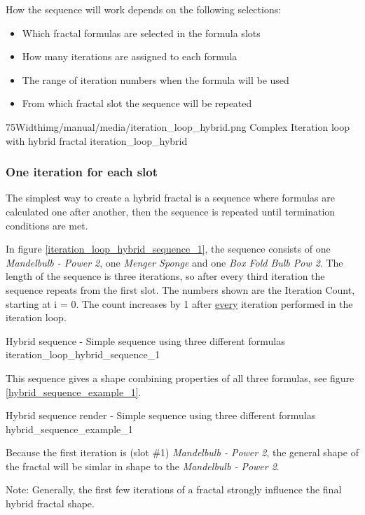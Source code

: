 How the sequence will work depends on the following selections:
\begin{itemize}
	\item Which fractal formulas are selected in the formula slots
	\item How many iterations are assigned to each formula
	\item The range of iteration numbers when the formula will be used
	\item From which fractal slot the sequence will be repeated
\end{itemize}

\simpleImageWithCaption75Width{img/manual/media/iteration_loop_hybrid.png}
{Complex Iteration loop with hybrid fractal}
{iteration_loop_hybrid}

\subsubsection{One iteration for each slot}

The simplest way to create a hybrid fractal is a sequence where formulas are calculated one after another, then the sequence is repeated until termination conditions are met.

In figure \ref{iteration_loop_hybrid_sequence_1}, the sequence consists of one \emph{Mandelbulb - Power 2}, one \emph{Menger Sponge} and
one \emph{Box Fold Bulb Pow 2}. The length of the sequence is three iterations, so after every third iteration the sequence repeats from the first slot. The numbers shown are the Iteration Count, starting at i = 0. The count increases by 1 after \underline{every} iteration performed in the iteration loop.

{Hybrid sequence - Simple sequence using three different formulas}
{iteration_loop_hybrid_sequence_1}

This sequence gives a shape combining properties of all three
formulas, see figure \ref{hybrid_sequence_example_1}.

{Hybrid sequence render - Simple sequence using three different formulas}
{hybrid_sequence_example_1}

Because the first iteration is (slot \#1) \emph{Mandelbulb - Power 2}, the general shape
of the fractal will be simlar in shape to the \emph{Mandelbulb - Power 2}.

Note: Generally, the first few iterations of a fractal strongly influence the final hybrid fractal shape.

